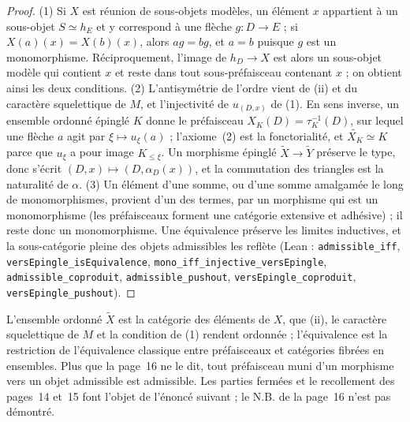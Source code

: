 \begin{proof}
(1) Si $X$ est réunion de sous-objets modèles, un élément $x$ appartient à un sous-objet $S \simeq h_E$ et y correspond à une flèche $g : D \to E$ ; si $X(a)(x) = X(b)(x)$, alors $a g = b g$, et $a = b$ puisque $g$ est un monomorphisme. Réciproquement, l'image de $h_D \to X$ est alors un sous-objet modèle qui contient $x$ et reste dans tout sous-préfaisceau contenant $x$ ; on obtient ainsi les deux conditions. (2) L'antisymétrie de l'ordre vient de (ii) et du caractère squelettique de $M$, et l'injectivité de $u_{(D,x)}$ de (1). En sens inverse, un ensemble ordonné épinglé $K$ donne le préfaisceau $X_K(D) = \tau_K^{-1}(D)$, sur lequel une flèche $a$ agit par $\xi \mapsto u_\xi(a)$ ; l'axiome~(2) est la fonctorialité, et $\widetilde{X_K} \simeq K$ parce que $u_\xi$ a pour image $K_{\leq \xi}$. Un morphisme épinglé $\widetilde X \to \widetilde Y$ préserve le type, donc s'écrit $(D, x) \mapsto (D, \alpha_D(x))$, et la commutation des triangles est la naturalité de $\alpha$. (3) Un élément d'une somme, ou d'une somme amalgamée le long de monomorphismes, provient d'un des termes, par un morphisme qui est un monomorphisme (les préfaisceaux forment une catégorie extensive et adhésive) ; il reste donc un monomorphisme. Une équivalence préserve les limites inductives, et la sous-catégorie pleine des objets admissibles les reflète (Lean : \texttt{admissible\_iff}, \texttt{versEpingle\_isEquivalence}, \texttt{mono\_iff\_injective\_versEpingle}, \texttt{admissible\_coproduit}, \texttt{admissible\_pushout}, \texttt{versEpingle\_coproduit}, \texttt{versEpingle\_pushout}).
\end{proof}

\begin{remarque}
L'ensemble ordonné $\widetilde X$ est la catégorie des éléments de $X$, que (ii), le caractère squelettique de $M$ et la condition de (1) rendent ordonnée ; l'équivalence est la restriction de l'équivalence classique entre préfaisceaux et catégories fibrées en ensembles. Plus que la page~16 ne le dit, tout préfaisceau muni d'un morphisme vers un objet admissible est admissible. Les parties fermées et le recollement des pages~14 et~15 font l'objet de l'énoncé suivant ; le N.B. de la page~16 n'est pas démontré.
\end{remarque}

